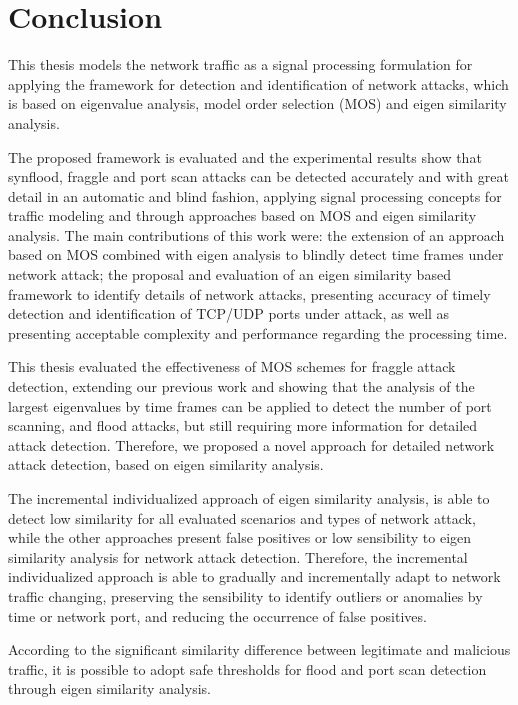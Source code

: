 \section{Conclusion}
\label{sc:conc_conclusion}

This thesis models the network traffic as a signal processing formulation for applying the framework for detection and identification of network attacks, which is based on eigenvalue analysis, model order selection (MOS) and eigen similarity analysis.

The proposed framework is evaluated and the experimental results show that synflood, fraggle and port scan attacks can be detected accurately and with great detail in an automatic and blind fashion, applying signal processing concepts for traffic modeling and through approaches based on MOS and eigen similarity analysis. The main contributions of this work were: the extension of an approach based on MOS combined with eigen analysis to blindly detect time frames under network attack; the proposal and evaluation of an eigen similarity based framework to identify details of network attacks, presenting accuracy of timely detection and identification of TCP/UDP ports under attack, as well as presenting acceptable complexity and performance regarding the processing time.

This thesis evaluated the effectiveness of MOS schemes for fraggle attack detection, extending our previous work \cite{tenorio2013greatest} and showing that the analysis of the largest eigenvalues by time frames can be applied to detect the number of port scanning, and flood attacks, but still requiring more information for detailed attack detection. Therefore, we proposed a novel approach for detailed network attack detection, based on eigen similarity analysis.

The incremental individualized approach of eigen similarity analysis, is able to detect low similarity for all evaluated scenarios and types of network attack, while the other approaches present false positives or low sensibility to eigen similarity analysis for network attack detection. Therefore, the incremental individualized approach is able to gradually and incrementally adapt to network traffic changing, preserving the sensibility to identify outliers or anomalies by time or network port, and reducing the occurrence of false positives.

According to the significant similarity difference between legitimate and malicious traffic, it is possible to adopt safe thresholds for flood and port scan detection through eigen similarity analysis.

